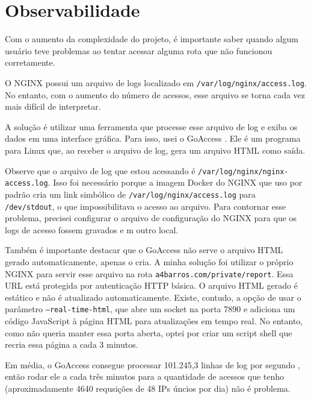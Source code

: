 \chapter{Observabilidade}

Com o aumento da complexidade do projeto, é importante saber quando algum usuário teve problemas ao 
tentar acessar alguma rota que não funcionou corretamente.

O NGINX possui um arquivo de logs localizado em \verb|/var/log/nginx/access.log|. No entanto, com o 
aumento do número de acessos, esse arquivo se torna cada vez mais difícil de interpretar.

A solução é utilizar uma ferramenta que processe esse arquivo de log e exiba os dados em uma 
interface gráfica. Para isso, usei o GoAccess \cite{goaccess}. Ele é um programa para Linux que, 
ao receber o arquivo de log, gera um arquivo HTML como saída.



Observe que o arquivo de log que estou acessando é \verb|/var/log/nginx/nginx-access.log|. Isso foi 
necessário porque a imagem Docker do NGINX que uso por padrão cria um link simbólico de \verb|/var/log/nginx/access.log| 
para \verb|/dev/stdout|, o que impossibilitava o acesso ao arquivo. Para contornar esse problema, 
precisei configurar o arquivo de configuração do NGINX para que os logs de acesso fossem gravados e
m outro local.

Também é importante destacar que o GoAccess não serve o arquivo HTML gerado automaticamente, apenas 
o cria. A minha solução foi utilizar o próprio NGINX para servir esse arquivo na rota \texttt{a4barros.com/private/report}. 
Essa URL está protegida por autenticação HTTP básica. O arquivo HTML gerado é estático e não é 
atualizado automaticamente. Existe, contudo, a opção de usar o parâmetro \texttt{--real-time-html}, 
que abre um socket na porta 7890 e adiciona um código JavaScript à página HTML para atualizações em 
tempo real. No entanto, como não queria manter essa porta aberta, optei por criar um script shell 
que recria essa página a cada 3 minutos.



Em média, o GoAccess consegue processar 101.245,3 linhas de log por segundo \cite{goaccess-speed},
então rodar ele a cada três minutos para a quantidade de acessos que tenho (aproximadamente 4640 requsições
de 48 IPs úncios por dia) não é problema.

